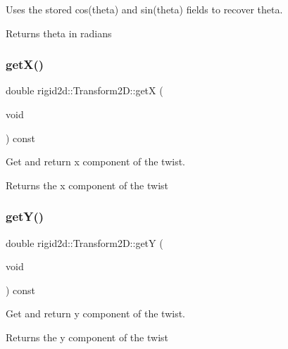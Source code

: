 Uses the stored cos(theta) and sin(theta) fields to recover theta. 

\begin{DoxyReturn}{Returns}
theta in radians 
\end{DoxyReturn}
\mbox{\label{classrigid2d_1_1Transform2D_a2670394279fdfe595d859a1deab2b93f}} 
\subsubsection{\texorpdfstring{get\+X()}{getX()}}
{\footnotesize\ttfamily double rigid2d\+::\+Transform2\+D\+::getX (\begin{DoxyParamCaption}\item[{void}]{ }\end{DoxyParamCaption}) const}



Get and return x component of the twist. 

\begin{DoxyReturn}{Returns}
the x component of the twist 
\end{DoxyReturn}
\mbox{\label{classrigid2d_1_1Transform2D_a8557f7ba90f5bc8ae468b56662e518e3}} 
\subsubsection{\texorpdfstring{get\+Y()}{getY()}}
{\footnotesize\ttfamily double rigid2d\+::\+Transform2\+D\+::getY (\begin{DoxyParamCaption}\item[{void}]{ }\end{DoxyParamCaption}) const}



Get and return y component of the twist. 

\begin{DoxyReturn}{Returns}
the y component of the twist 
\end{DoxyReturn}
\mbox{\label{classrigid2d_1_1Transform2D_a9d0ba77785a63d6299fe0671d8280584}} 
